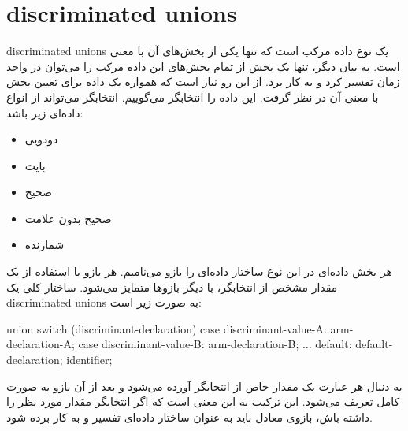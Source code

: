 
\section{\glspl*{discriminated union}}

% 

\glspl{discriminated union} یک نوع داده مرکب است که تنها یکی از بخش‌های آن با
معنی است.
به بیان دیگر، تنها یک بخش از تمام بخش‌های این داده مرکب را می‌توان در واحد زمان
تفسیر کرد و به کار برد.
از این رو نیاز است که همواره یک داده برای تعیین بخش با معنی آن در نظر گرفت. این
داده را انتخابگر می‌گوییم.
انتخابگر می‌تواند از انواع داده‌ای زیر باشد:
\begin{itemize}
  \item دودویی
  \item بایت
  \item صحیح
  \item صحیح بدون علامت
  \item شمارنده
\end{itemize}

هر بخش داده‌ای در این نوع ساختار داده‌ای را بازو می‌نامیم. هر بازو با استفاده از
یک مقدار مشخص از انتخابگر، با دیگر بازوها متمایز می‌شود.
ساختار کلی یک \glspl{discriminated union} به صورت زیر است:

\begin{C++}
 union switch (discriminant-declaration) { 
	 case discriminant-value-A:
	    arm-declaration-A;
	 case discriminant-value-B:
	    arm-declaration-B;
	 ...
	 default: 
	 	default-declaration;
 } identifier;
 \end{C++}
 


به دنبال هر عبارت  یک مقدار خاص از انتخابگر آورده می‌شود و بعد از آن
بازو به صورت کامل تعریف می‌شود.
این ترکیب به این معنی است که اگر انتخابگر مقدار مورد نظر را داشته باش، بازوی
معادل باید به عنوان ساختار داده‌ای تفسیر و به کار برده شود.

